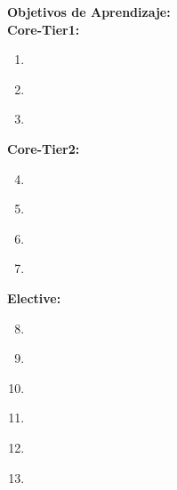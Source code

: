 \noindent \textbf{Objetivos de Aprendizaje:}\\
\noindent \textbf{Core-Tier1:}
\begin{enumerate}
	\setcounter{enumi}{0}
	\item \SERequirementsEngineeringLOListTheOfCase\xspace[\SERequirementsEngineeringLOListTheOfCaseLevel]\label{sec:BOK:SERequirementsEngineeringLOListTheOfCase}
	\item \SERequirementsEngineeringLODescribeHowEngineering\xspace[\SERequirementsEngineeringLODescribeHowEngineeringLevel]\label{sec:BOK:SERequirementsEngineeringLODescribeHowEngineering}
	\item \SERequirementsEngineeringLOInterpret\xspace[\SERequirementsEngineeringLOInterpretLevel]\label{sec:BOK:SERequirementsEngineeringLOInterpret}
\end{enumerate}
\noindent \textbf{Core-Tier2:}
\begin{enumerate}
	\setcounter{enumi}{3}
	\item \SERequirementsEngineeringLODescribeTheOfTechniques\xspace[\SERequirementsEngineeringLODescribeTheOfTechniquesLevel]\label{sec:BOK:SERequirementsEngineeringLODescribeTheOfTechniques}
	\item \SERequirementsEngineeringLOListTheOfModel\xspace[\SERequirementsEngineeringLOListTheOfModelLevel]\label{sec:BOK:SERequirementsEngineeringLOListTheOfModel}
	\item \SERequirementsEngineeringLOIdentifyBoth\xspace[\SERequirementsEngineeringLOIdentifyBothLevel]\label{sec:BOK:SERequirementsEngineeringLOIdentifyBoth}
	\item \SERequirementsEngineeringLOConductAA\xspace[\SERequirementsEngineeringLOConductAALevel]\label{sec:BOK:SERequirementsEngineeringLOConductAA}
\end{enumerate}
\noindent \textbf{Elective:}
\begin{enumerate}
	\setcounter{enumi}{7}
	\item \SERequirementsEngineeringLOApplyKey\xspace[\SERequirementsEngineeringLOApplyKeyLevel]\label{sec:BOK:SERequirementsEngineeringLOApplyKey}
	\item \SERequirementsEngineeringLOCompareTheAnd\xspace[\SERequirementsEngineeringLOCompareTheAndLevel]\label{sec:BOK:SERequirementsEngineeringLOCompareTheAnd}
	\item \SERequirementsEngineeringLOUseAFormal\xspace[\SERequirementsEngineeringLOUseAFormalLevel]\label{sec:BOK:SERequirementsEngineeringLOUseAFormal}
	\item \SERequirementsEngineeringLOTranslateInto\xspace[\SERequirementsEngineeringLOTranslateIntoLevel]\label{sec:BOK:SERequirementsEngineeringLOTranslateInto}
	\item \SERequirementsEngineeringLOCreateAA\xspace[\SERequirementsEngineeringLOCreateAALevel]\label{sec:BOK:SERequirementsEngineeringLOCreateAA}
	\item \SERequirementsEngineeringLODifferentiateBetweenBackward\xspace[\SERequirementsEngineeringLODifferentiateBetweenBackwardLevel]\label{sec:BOK:SERequirementsEngineeringLODifferentiateBetweenBackward}
\end{enumerate}



